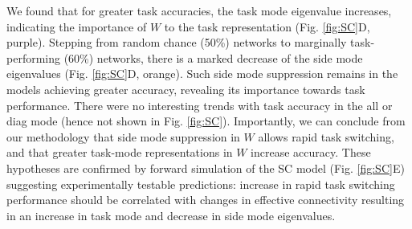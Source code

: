 \documentclass[11pt]{article}
\begin{document}

We found that for greater task accuracies, the task mode eigenvalue increases, indicating the importance of $W$ to the task representation (Fig. \ref{fig:SC}D, purple).  
Stepping from random chance (50\%) networks to marginally task-performing (60\%) networks, there is a marked decrease of the side mode eigenvalues (Fig. \ref{fig:SC}D, orange).  
Such side mode suppression remains in the models achieving greater accuracy, revealing its importance towards task performance.   
There were no interesting trends with task accuracy in the all or diag mode (hence not shown in Fig. \ref{fig:SC}). 
Importantly, we can conclude from our methodology that side mode suppression in $W$ allows rapid task switching, and that greater task-mode representations in $W$ increase accuracy.  These hypotheses are confirmed by forward simulation of the SC model (Fig. \ref{fig:SC}E) suggesting experimentally testable predictions: increase in rapid task switching performance should be correlated with changes in effective connectivity resulting in an increase in task mode and decrease in side mode eigenvalues.

\end{document}
